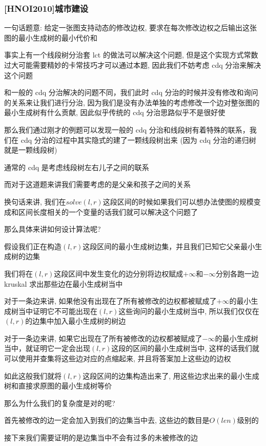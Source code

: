 \subsubsection{[HNOI2010]城市建设}

一句话题意: 给定一张图支持动态的修改边权, 要求在每次修改边权之后输出这张图的最小生成树的最小代价和

事实上有一个线段树分治套 lct 的做法可以解决这个问题, 但是这个实现方式常数过大可能需要精妙的卡常技巧才可以通过本题, 因此我们不妨考虑 cdq 分治来解决这个问题

和一般的 cdq 分治解决的问题不同，我们此时 cdq 分治的时候并没有修改和询问的关系来让我们进行分治, 因为我们是没有办法单独的考虑修改一个边对整张图的最小生成树有什么贡献, 因此似乎传统的 cdq 分治思路似乎不是很好使

那么我们通过刚才的例题可以发现一般的 cdq 分治和线段树有着特殊的联系，我们在 cdq 分治的过程中其实隐式的建了一颗线段树出来 (因为 cdq 分治的递归树就是一颗线段树)

通常的 cdq 是考虑线段树左右儿子之间的联系

而对于这道题来讲我们需要考虑的是父亲和孩子之间的关系

换句话来讲, 我们在$solve(l,r)$这段区间的时候如果我们可以想办法使图的规模变成和区间长度相关的一个变量的话我们就可以解决这个问题了

那么具体来讲如何设计算法呢?

假设我们正在构造$(l,r)$这段区间的最小生成树边集，并且我们已知它父亲最小生成树的边集

我们将在$(l,r)$这段区间中发生变化的边分别将边权赋成$+ \infty$和$-\infty$分别各跑一边 kruskal 求出那些边在最小生成树当中

对于一条边来讲, 如果他没有出现在了所有被修改的边权都被赋成了$+\infty$的最小生成树当中证明它不可能出现在$(l,r)$这些询问的最小生成树当中, 所以我们仅仅在$(l,r)$的边集中加入最小生成树的树边

对于一条边来讲, 如果它出现在了所有被修改的边权都被赋成了$- \infty$的最小生成树当中，就证明它一定会出现$(l,r)$这段的区间的最小生成树当中, 这样的话我们就可以使用并查集将这些边对应的点缩起来, 并且将答案加上这些边的边权

如此这般我们就将$(l,r)$这段区间的边集构造出来了, 用这些边求出来的最小生成树和直接求原图的最小生成树等价

那么为什么我们的复杂度是对的呢?

首先被修改的边一定会加入到我们的边集当中去, 这些边的数目是$O(len)$级别的

接下来我们需要证明的是边集当中不会有过多的未被修改的边

